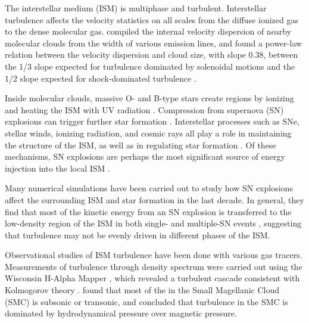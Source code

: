 The interstellar medium (ISM) is multiphase and turbulent. Interstellar turbulence affects the velocity statistics on all scales from the diffuse ionized gas to the dense molecular gas. \citet{larson_turbulence_1981} compiled the internal velocity dispersion of nearby molecular clouds from the width of various emission lines, and found a power-law relation between the velocity dispersion and cloud size, with slope 0.38, between the 1/3 slope expected for turbulence dominated by solenoidal motions \citep{kolmogorov_local_1941} and the 1/2 slope expected for shock-dominated turbulence \citep[e.g.,][]{galtier_exact_2011,federrath_universality_2013}.

Inside molecular clouds, massive O- and B-type stars create  regions by ionizing and heating the ISM with UV radiation \citep[see, e.g.,][]{spitzer_physical_1978}. 
Compression from supernova (SN) explosions can trigger further star formation \citep[][]{kennicutt_star_2012}. Interstellar processes such as SNe, stellar winds, ionizing radiation, and cosmic rays all play a role in maintaining the structure of the ISM, as well as in regulating star formation \citep[][]{hennebelle_turbulent_2012,rathjen_silcc_2021,xu_cosmic_2022,hu_velocity_2022}. Of these mechanisms, SN explosions are perhaps the most significant source of energy injection into the local ISM \citep[][]{mac_low_control_2004,padoan_supernova_2016}. 

Many numerical simulations have been carried out to study how SN explosions affect the surrounding ISM and star formation in the last decade. In general, they find that most of the kinetic energy from an SN explosion is transferred to the low-density region of the ISM in both single- \citep[see, e.g.,][]{kim_momentum_2015,martizzi_supernova_2015,li_supernova_2015} and multiple-SN events \citep[][]{padoan_supernova_2016}, suggesting that turbulence may not be evenly driven in different phases of the ISM.

Observational studies of ISM turbulence have been done with various gas tracers. 
Measurements of turbulence through density spectrum were carried out using the Wisconsin H-Alpha Mapper \citep[WHAM;][]{haffner_wisconsin_2003,haffner_early_2010}, which revealed a turbulent cascade consistent with Kolmogorov theory \citep[][]{chepurnov_velocity_2010}. \citet[][]{burkhart_characterizing_2009} found that most of the  in the Small Magellanic Cloud (SMC) is subsonic or transonic, and concluded that turbulence in the SMC is dominated by hydrodynamical pressure over magnetic pressure. 

